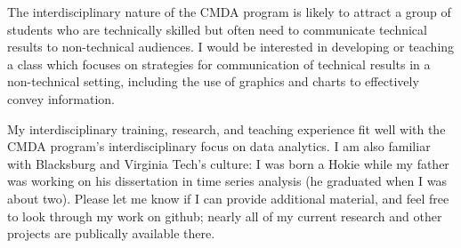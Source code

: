 \documentclass[11pt,letterpaper,sans,unicode]{moderncv}        %
\begin{document}
The interdisciplinary nature of the CMDA program is likely to attract a group of students who are technically skilled but often need to communicate technical results to non-technical audiences. I would be interested in developing or teaching a class which focuses on strategies for communication of technical results in a non-technical setting, including the use of graphics and charts to effectively convey information. 





\vspace{.5cm}
My interdisciplinary training, research, and teaching experience fit well with the CMDA program's interdisciplinary focus on data analytics. I am also familiar with Blacksburg and Virginia Tech's culture: I was born a Hokie while my father was working on his dissertation in time series analysis (he graduated when I was about two). Please let me know if I can provide additional material, and feel free to look through my work on github; nearly all of my current research and other projects are publically available there. 

\vspace{1cm}
\makeletterclosing

\end{document}
